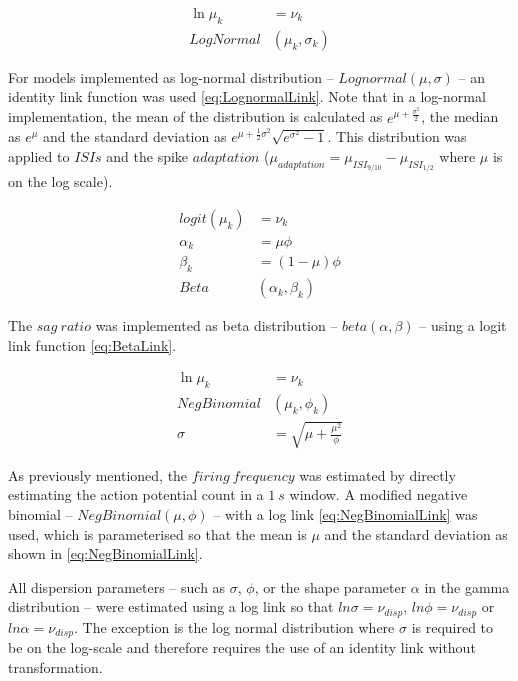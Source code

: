 \documentclass[
  12pt,
  a4paper,
  openany]{book}
\begin{document}
\begin{align}
\ln{\mu_{k}} &= \nu_{k} \nonumber \\
LogNormal & (\mu_{k},\sigma_{k})
\label{eq:LognormalLink}
\end{align}

\noindent
For models implemented as log-normal distribution -- \(Lognormal(\mu,\sigma)\) -- an identity link function was used \eqref{eq:LognormalLink}. Note that in a log-normal implementation, the mean of the distribution is calculated as \(e^{\mu+\frac{\sigma^2}{2}}\), the median as \(e^\mu\) and the standard deviation as \(e^{\mu+\frac{1}{2}\sigma^2}\sqrt{e^{\sigma^2}-1}\). This distribution was applied to \(ISIs\) and the spike \(adaptation\) (\(\mu_{adaptation}=\mu_{ISI_{9/10}}-\mu_{ISI_{1/2}}\) where \(\mu\) is on the log scale).

\begin{align}
logit(\mu_{k}) &= \nu_{k} \nonumber \\
\alpha_{k} &= \mu\phi \nonumber \\
\beta_{k} &= (1-\mu)\phi \nonumber \\
Beta&(\alpha_{k},\beta_{k})
\label{eq:BetaLink}
\end{align}

\noindent
The \(sag\ ratio\) was implemented as beta distribution -- \(beta(\alpha,\beta)\) -- using a logit link function \eqref{eq:BetaLink}.

\begin{align}
\ln{\mu_{k}} &= \nu_{k} \nonumber \\
NegBinomial&(\mu_{k},\phi_{k}) \nonumber \\
\sigma &= \sqrt{\mu + \frac{\mu^2}{\phi}}
\label{eq:NegBinomialLink}
\end{align}

\noindent
As previously mentioned, the \(firing\ frequency\) was estimated by directly estimating the action potential count in a \(1\ s\) window. A modified negative binomial -- \(NegBinomial(\mu,\phi)\) -- with a log link \eqref{eq:NegBinomialLink} was used, which is parameterised so that the mean is \(\mu\) and the standard deviation as shown in \eqref{eq:NegBinomialLink}.

All dispersion parameters -- such as \(\sigma\), \(\phi\), or the shape parameter \(\alpha\) in the gamma distribution -- were estimated using a log link so that \(ln{\sigma} = \nu_{disp}\), \(ln{\phi} = \nu_{disp}\) or \(ln{\alpha} = \nu_{disp}\). The exception is the log normal distribution where \(\sigma\) is required to be on the log-scale and therefore requires the use of an identity link without transformation.
\end{document}
